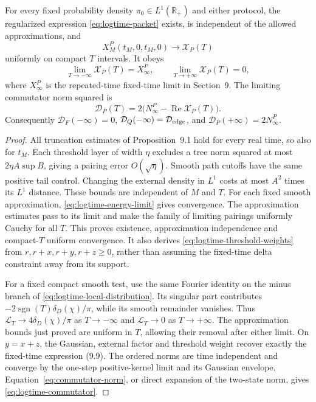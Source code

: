 \begin{theorem}
For every fixed probability density $\pi_0\in L^1(\mathbb R_+)$ and either
protocol, the regularized expression \eqref{eq:logtime-packet} exists,
is independent of the allowed approximations, and
\begin{equation}
 X^P_M(t_M,0,t_M,0)\longrightarrow\mathcal X_P(T)
 \label{eq:logtime-packet-convergence}
\end{equation}
uniformly on compact $T$ intervals. It obeys
\begin{equation}
 \lim_{T\to-\infty}\mathcal X_P(T)=X^P_\infty,
 \qquad \lim_{T\to+\infty}\mathcal X_P(T)=0,
 \label{eq:logtime-plateaux}
\end{equation}
where $X^P_\infty$ is the repeated-time fixed-time limit in Section~9.
The limiting commutator norm squared is
\begin{equation}
 \mathcal D_P(T)=2\bigl(N^P_\infty-\operatorname{Re}\mathcal X_P(T)\bigr).
 \label{eq:logtime-commutator}
\end{equation}
Consequently $\mathcal D_F(-\infty)=0$,
$\mathcal D_Q(-\infty)=\mathcal D_{\rm edge}$, and
$\mathcal D_P(+\infty)=2N^P_\infty$.
\label{thm:logtime-packet}
\end{theorem}
\begin{proof}
All truncation estimates of Proposition~9.1 hold for every real time,
so also for $t_M$. Each threshold layer of width $\eta$ excludes a
tree norm squared at most $2\eta A\sup B$, giving a pairing error
$O(\sqrt\eta)$. Smooth path cutoffs have the same positive tail control.
Changing the external density in $L^1$ costs at most $A^2$ times its
$L^1$ distance. These bounds are independent of $M$ and $T$.
For each fixed smooth approximation, \eqref{eq:logtime-energy-limit}
gives convergence. The approximation estimates pass to its limit and
make the family of limiting pairings uniformly Cauchy for all $T$.
This proves existence, approximation independence and compact-$T$
uniform convergence. It also derives \eqref{eq:logtime-threshold-weights}
from $r,r+x,r+y,r+z\ge0$, rather than assuming the fixed-time delta
constraint away from its support.

For a fixed compact smooth test, use the same Fourier identity on the
minus branch of \eqref{eq:logtime-local-distribution}. Its singular part
contributes $-2\operatorname{sgn}(T)\delta_D(\chi)/\pi$, while its
smooth remainder vanishes. Thus $\mathcal L_T\to4\delta_D(\chi)/\pi$
as $T\to-\infty$ and $\mathcal L_T\to0$ as $T\to+\infty$.
The approximation bounds just proved are uniform in $T$, allowing their
removal after either limit. On $y=x+z$, the Gaussian, external factor
and threshold weight recover exactly the fixed-time expression (9.9).
The ordered norms are time independent and converge by the one-step
positive-kernel limit and its Gaussian envelope. Equation~\eqref{eq:commutator-norm}, or
direct expansion of the two-state norm, gives
\eqref{eq:logtime-commutator}.
\end{proof}
